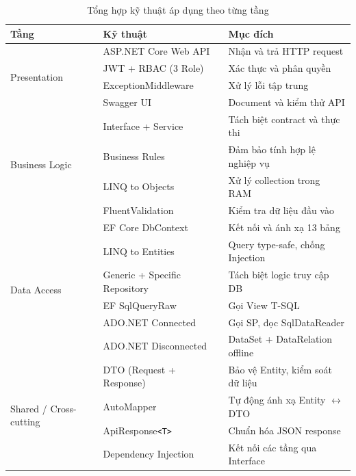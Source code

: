 \begin{table}[H]
  \begin{center}
    \begin{tabular}{|l|l|l|}
      \hline
      \textbf{Tầng} & \textbf{Kỹ thuật} & \textbf{Mục đích} \\
      \hline
      \multirow{4}{*}{Presentation}
        & ASP.NET Core Web API
          & Nhận và trả HTTP request \\
        & JWT + RBAC (3 Role)
          & Xác thực và phân quyền \\
        & ExceptionMiddleware
          & Xử lý lỗi tập trung \\
        & Swagger UI
          & Document và kiểm thử API \\
      \hline
      \multirow{4}{*}{Business Logic}
        & Interface + Service
          & Tách biệt contract và thực thi \\
        & Business Rules
          & Đảm bảo tính hợp lệ nghiệp vụ \\
        & LINQ to Objects
          & Xử lý collection trong RAM \\
        & FluentValidation
          & Kiểm tra dữ liệu đầu vào \\
      \hline
      \multirow{6}{*}{Data Access}
        & EF Core DbContext
          & Kết nối và ánh xạ 13 bảng \\
        & LINQ to Entities
          & Query type-safe, chống Injection \\
        & Generic + Specific Repository
          & Tách biệt logic truy cập DB \\
        & EF SqlQueryRaw
          & Gọi View T-SQL \\
        & ADO.NET Connected
          & Gọi SP, đọc SqlDataReader \\
        & ADO.NET Disconnected
          & DataSet + DataRelation offline \\
      \hline
      \multirow{4}{*}{Shared / Cross-cutting}
        & DTO (Request + Response)
          & Bảo vệ Entity, kiểm soát dữ liệu \\
        & AutoMapper
          & Tự động ánh xạ Entity $\leftrightarrow$ DTO \\
        & ApiResponse\texttt{<T>}
          & Chuẩn hóa JSON response \\
        & Dependency Injection
          & Kết nối các tầng qua Interface \\
      \hline
    \end{tabular}
  \end{center}
  \caption{Tổng hợp kỹ thuật áp dụng theo từng tầng}
  \label{table:summary}
\end{table}
